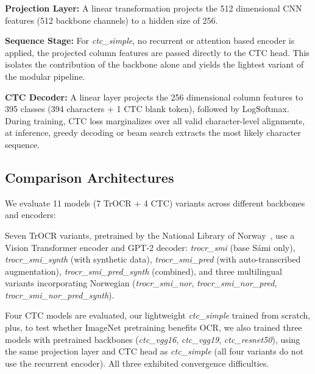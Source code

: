\documentclass[conference]{IEEEtran}
\newcommand{\trocrSize}{350}
\newcommand{\ctcSize}{23}
\newcommand{\charsetSize}{395}
\newcommand{\sizeRatio}{15}
\newcommand{\hiddenDim}{256}
\newcommand{\lstmOutputDim}{512}
\newcommand{\numParams}{6}
\newcommand{\numCharsVocab}{394}
\begin{document}
\textbf{Projection Layer:} A linear transformation projects the \lstmOutputDim{} dimensional CNN features (512 backbone channels) to a hidden size of \hiddenDim{}.

\textbf{Sequence Stage:} For \textit{ctc\_simple}, no recurrent or attention based encoder is applied, the projected column features are passed directly to the CTC head. This isolates the contribution of the backbone alone and yields the lightest variant of the modular pipeline.

\textbf{CTC Decoder:} A linear layer projects the \hiddenDim{} dimensional column features to \charsetSize{} classes (\numCharsVocab{} characters + 1 CTC blank token), followed by LogSoftmax. During training, CTC loss marginalizes over all valid character-level alignments, at inference, greedy decoding or beam search extracts the most likely character sequence.


\subsection{Comparison Architectures}
\label{subsec:comparison}

We evaluate 11 models (7 TrOCR + 4 CTC) variants across different backbones and encoders:

Seven TrOCR variants, pretrained by the National Library of Norway~\cite{enstad2025}, use a Vision Transformer encoder and GPT-2 decoder: \textit{trocr\_smi} (base S\'{a}mi only), \textit{trocr\_smi\_synth} (with synthetic data), \textit{trocr\_smi\_pred} (with auto-transcribed augmentation), \textit{trocr\_smi\_pred\_synth} (combined), and three multilingual variants incorporating Norwegian (\textit{trocr\_smi\_nor}, \textit{trocr\_smi\_nor\_pred}, \textit{trocr\_smi\_nor\_pred\_synth}).

Four CTC models are evaluated, our lightweight \textit{ctc\_simple} trained from scratch, plus, to test whether ImageNet pretraining benefits OCR, we also trained three models with pretrained backbones (\textit{ctc\_vgg16}, \textit{ctc\_vgg19}, \textit{ctc\_resnet50}), using the same projection layer and CTC head as \textit{ctc\_simple} (all four variants do not use the recurrent encoder). All three exhibited convergence difficulties. 
\end{document}
